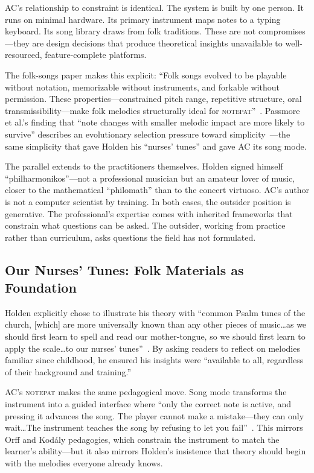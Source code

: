\documentclass[10pt,letterpaper,twocolumn]{article}
\newcommand{\np}{\textsc{notepat}}
\begin{document}
AC's relationship to constraint is identical. The system is built by one person. It runs on minimal hardware. Its primary instrument maps notes to a typing keyboard. Its song library draws from folk traditions. These are not compromises---they are design decisions that produce theoretical insights unavailable to well-resourced, feature-complete platforms.

The folk-songs paper makes this explicit: ``Folk songs evolved to be playable without notation, memorizable without instruments, and forkable without permission. These properties---constrained pitch range, repetitive structure, oral transmissibility---make folk melodies structurally ideal for \np{}''~\citep{acfolk2026}. Passmore et al.'s finding that ``note changes with smaller melodic impact are more likely to survive'' describes an evolutionary selection pressure toward simplicity~\citep{passmore2023}---the same simplicity that gave Holden his ``nurses' tunes'' and gave AC its song mode.

The parallel extends to the practitioners themselves. Holden signed himself ``philharmonikos''---not a professional musician but an amateur lover of music, closer to the mathematical ``philomath'' than to the concert virtuoso. AC's author is not a computer scientist by training. In both cases, the outsider position is generative. The professional's expertise comes with inherited frameworks that constrain what questions can be asked. The outsider, working from practice rather than curriculum, asks questions the field has not formulated.

\subsection{Our Nurses' Tunes: Folk Materials as Foundation}

Holden explicitly chose to illustrate his theory with ``common Psalm tunes of the church, [which] are more universally known than any other pieces of music\ldots as we should first learn to spell and read our mother-tongue, so we should first learn to apply the scale\ldots to our nurses' tunes''~\citep{raz2025}. By asking readers to reflect on melodies familiar since childhood, he ensured his insights were ``available to all, regardless of their background and training.''

AC's \np{} makes the same pedagogical move. Song mode transforms the instrument into a guided interface where ``only the correct note is active, and pressing it advances the song. The player cannot make a mistake---they can only wait\ldots The instrument teaches the song by refusing to let you fail''~\citep{acplork2026}. This mirrors Orff and Kod\'{a}ly pedagogies, which constrain the instrument to match the learner's ability---but it also mirrors Holden's insistence that theory should begin with the melodies everyone already knows.
\end{document}
